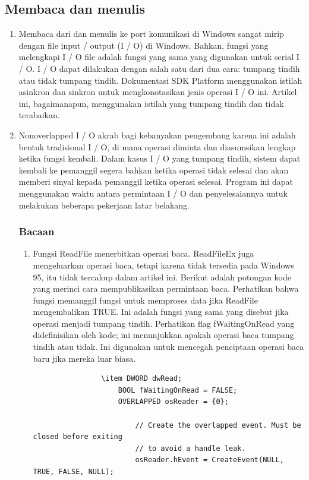 	\subsection{Membaca dan menulis}
		\begin{enumerate}
			\item Membaca dari dan menulis ke port komunikasi di Windows sangat mirip dengan file input / output (I / O) di Windows. Bahkan, fungsi yang melengkapi I / O file adalah fungsi yang sama yang digunakan untuk serial I / O. I / O dapat dilakukan dengan salah satu dari dua cara: tumpang tindih atau tidak tumpang tindih. Dokumentasi SDK Platform menggunakan istilah asinkron dan sinkron untuk mengkonotasikan jenis operasi I / O ini. Artikel ini, bagaimanapun, menggunakan istilah yang tumpang tindih dan tidak terabaikan.
			\item Nonoverlapped I / O akrab bagi kebanyakan pengembang karena ini adalah bentuk tradisional I / O, di mana operasi diminta dan diasumsikan lengkap ketika fungsi kembali. Dalam kasus I / O yang tumpang tindih, sistem dapat kembali ke pemanggil segera bahkan ketika operasi tidak selesai dan akan memberi sinyal kepada pemanggil ketika operasi selesai. Program ini dapat menggunakan waktu antara permintaan I / O dan penyelesaiannya untuk melakukan beberapa pekerjaan latar belakang.
				\subsubsection{Bacaan}
					\begin{enumerate}
						\item Fungsi ReadFile menerbitkan operasi baca. ReadFileEx juga mengeluarkan operasi baca, tetapi karena tidak tersedia pada Windows 95, itu tidak tercakup dalam artikel ini. Berikut adalah potongan kode yang merinci cara mempublikasikan permintaan baca. Perhatikan bahwa fungsi memanggil fungsi untuk memproses data jika ReadFile mengembalikan TRUE. Ini adalah fungsi yang sama yang disebut jika operasi menjadi tumpang tindih. Perhatikan flag fWaitingOnRead yang didefinisikan oleh kode; ini menunjukkan apakah operasi baca tumpang tindih atau tidak. Ini digunakan untuk mencegah penciptaan operasi baca baru jika mereka luar biasa.
				
				\begin{verbatim}
				\item DWORD dwRead;
					BOOL fWaitingOnRead = FALSE;
					OVERLAPPED osReader = {0};

						// Create the overlapped event. Must be closed before exiting
						// to avoid a handle leak.
						osReader.hEvent = CreateEvent(NULL, TRUE, FALSE, NULL);


\end{verbatim}
\end{enumerate}
\end{enumerate}
